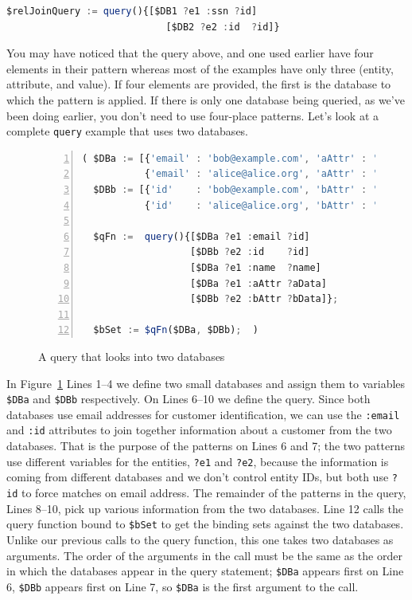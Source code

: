 \documentclass[9pt,letterpaper]{article}
\newcommand{\stt}[1]{\texttt{#1}} %
\begin{document}
\begin{lstlisting}[language=JavaScript,numbers=none,basicstyle=\ttfamily\scriptsize]
   $relJoinQuery := query(){[$DB1 ?e1 :ssn ?id]
                            [$DB2 ?e2 :id  ?id]}
\end{lstlisting} \vspace{-2em}

You may have noticed that the query above, and one used earlier have four elements in their pattern whereas most of the examples have only three (entity, attribute, and value).
If four elements are provided, the first is the database to which the pattern is applied.
If there is only one database being queried, as we've been doing earlier, you don't need to use four-place patterns.
Let's look at a complete \stt{query} example that uses two databases.

\begin{figure}[H]
    \caption{A query that looks into two databases}
    \label{code:two-database-query}
\begin{lstlisting}[language=JavaScript,numberstyle=\scriptsize,basicstyle=\ttfamily\scriptsize,numbers=left,stepnumber=1,breaklines=true]
( $DBa := [{'email' : 'bob@example.com', 'aAttr' : 'Bob-A-data',   'name' : 'Bob'},
           {'email' : 'alice@alice.org', 'aAttr' : 'Alice-A-data', 'name' : 'Alice'}];
  $DBb := [{'id'    : 'bob@example.com', 'bAttr' : 'Bob-B-data'},
           {'id'    : 'alice@alice.org', 'bAttr' : 'Alice-B-data'}];

  $qFn :=  query(){[$DBa ?e1 :email ?id]
                   [$DBb ?e2 :id    ?id]
                   [$DBa ?e1 :name  ?name]
                   [$DBa ?e1 :aAttr ?aData]
                   [$DBb ?e2 :bAttr ?bData]};

  $bSet := $qFn($DBa, $DBb);  )
\end{lstlisting}
  \end{figure} \vspace{-2em}

  In Figure~\ref{code:two-database-query} Lines 1--4 we define two small databases and assign them to variables \stt{\$DBa} and \stt{\$DBb} respectively. On Lines 6--10 we define the query.
Since both databases use email addresses for customer identification, we can use the \stt{:email} and \stt{:id} attributes to join together information about a customer from the two databases.
That is the purpose of the patterns on Lines 6 and 7; the two patterns use different variables for the entities, \stt{?e1} and \stt{?e2},
because the information is coming from different databases and we don't control entity IDs, but both use \stt{?id} to force
matches on email address.
The remainder of the patterns in the query, Lines 8--10, pick up various information from the two databases.
Line 12 calls the query function bound to \stt{\$bSet} to get the binding sets against the two databases.
Unlike our previous calls to the query function, this one takes two databases as arguments.
The order of the arguments in the call must be the same as the order in which the databases appear in the query statement;
\stt{\$DBa} appears first on Line 6, \stt{\$DBb} appears first on Line 7, so \stt{\$DBa} is the first argument to the call.
\end{document}
